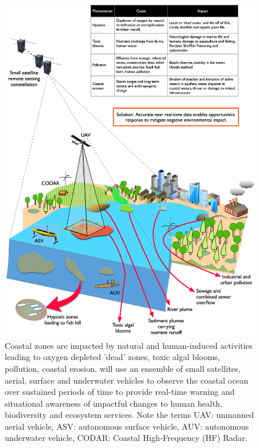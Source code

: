 \documentclass[12pt]{article}
\begin{document}
\begin{figure}[H]
  \centering
  \includegraphics[scale=0.135]{fig/mega-cities-toxic-1.jpg}
  \caption{Coastal zones are impacted by natural and human-induced
    activities leading to oxygen depleted 'dead' zones, toxic algal
    blooms, pollution, coastal erosion. \pro will use an ensemble of
    small satellites, aerial, surface and underwater vehicles to
    observe the coastal ocean over sustained periods of time to
    provide real-time warning and situational awareness of impactful
    changes to human health, biodiversity and ecosystem services. Note
    the terms UAV: unmanned aerial vehicle, ASV: autonomous surface
    vehicle, AUV: autonomous underwater vehicle, CODAR: Coastal
    High-Frequency (HF) Radar.}
    \label{fig:mega-cities}
\end{figure}

\end{document}
